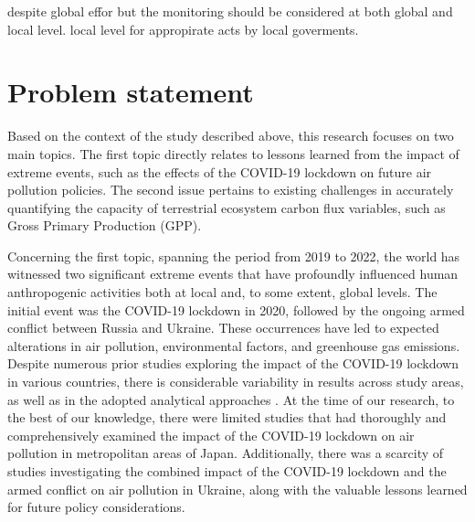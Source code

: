 despite global effor but the monitoring should be considered at both global and local level. local level for appropirate acts by local goverments.

\section{Problem statement}
Based on the context of the study described above, this research focuses on two main topics. The first topic directly relates to lessons learned from the impact of extreme events, such as the effects of the COVID-19 lockdown on future air pollution policies. The second issue pertains to existing challenges in accurately quantifying the capacity of terrestrial ecosystem carbon flux variables, such as Gross Primary Production (GPP). \par

Concerning the first topic, spanning the period from 2019 to 2022, the world has witnessed two significant extreme events that have profoundly influenced human anthropogenic activities both at local and, to some extent, global levels. The initial event was the COVID-19 lockdown in 2020, followed by the ongoing armed conflict between Russia and Ukraine. These occurrences have led to expected alterations in air pollution, environmental factors, and greenhouse gas emissions. Despite numerous prior studies exploring the impact of the COVID-19 lockdown in various countries, there is considerable variability in results across study areas, as well as in the adopted analytical approaches \citep{shi2021abrupt}. At the time of our research, to the best of our knowledge, there were limited studies that had thoroughly and comprehensively examined the impact of the COVID-19 lockdown on air pollution in metropolitan areas of Japan. Additionally, there was a scarcity of studies investigating the combined impact of the COVID-19 lockdown and the armed conflict on air pollution in Ukraine, along with the valuable lessons learned for future policy considerations.\par

